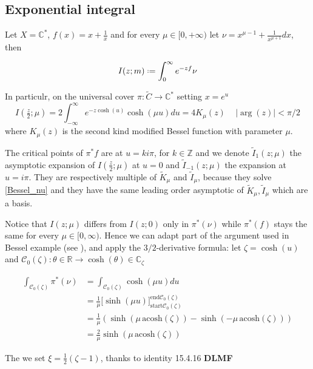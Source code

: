 \documentclass{article}
\newcommand{\Z}{\mathbb{Z}}
\newcommand{\R}{\mathbb{R}}
\newcommand{\C}{\mathbb{C}}
\begin{document}
\subsection{Exponential integral}

Let $X=\C^*$, $f(x)=x+\frac{1}{x}$ and for every $\mu\in [0,+\infty)$ let $\nu=x^{\mu-1}+\frac{1}{x^{\mu+1}}dx$, then  

\begin{equation}
I(z;m)\defeq\int_{0}^{\infty}e^{-zf}\nu
\end{equation}

In particulr, on the universal cover $\pi\colon\tilde{C}\to \C^*$ setting $x=e^u$ 
\begin{equation}
I(\tfrac{z}{2};\mu)=2\int_{-\infty}^{\infty}e^{-z\cosh(u)}\cosh(\mu u)du=4K_\mu(z)\,\quad |\arg(z)|<\pi/2
\end{equation} 
where $K_\mu(z)$ is the second kind modified Bessel function with parameter $\mu$. 

The critical points of $\pi^* f$ are at $u=k i \pi$, for $k\in\Z$ and we denote $\tilde{I}_{1}(z;\mu)$ the asymptotic expansion of $I(\tfrac{z}{2};\mu)$ at $u=0$ and $\tilde{I}_{-1}(z;\mu)$ the expansion at $u=i \pi$. They are respectively multiple of $\tilde{K}_{\mu}$ and $\tilde{I}_{\mu}$, because they solve \eqref{Bessel_nu} and they have the same leading order asymptotic of $\tilde{K}_{\mu}, \tilde{I}_{\mu}$ which are a basis.  

Notice that $I(z;\mu)$ differs from $I(z;0)$ only in $\pi^*(\nu)$ while $\pi^*(f)$ stays the same for every $\mu\in [0,\infty)$. Hence we can adapt part of the argument used in Bessel example (see ), and apply the $3/2$-derivative formula: let $\zeta=\cosh(u)$ and $\mathcal{C}_0(\zeta)\colon\theta\in\R\to\cosh(\theta)\in\C_\zeta$

\begin{align*}
\int_{\mathcal{C}_0(\zeta)}\pi^*(\nu)&=\int_{\mathcal{C}_0(\zeta)}\cosh(\mu u)du\\
&=\frac{1}{\mu}\Big[\sinh(\mu u)\Big]_{\mathrm{start}\mathcal{C}_0(\zeta)}^{\mathrm{end}\mathcal{C}_0(\zeta)}\\
&=\frac{1}{\mu}\left(\sinh\left(\mu\,\mathrm{acosh}\left(\zeta\right)\right)-\sinh\left(-\mu\,\mathrm{acosh}\left(\zeta\right)\right)\right)\\
&=\frac{2}{\mu}\sinh\left(\mu\,\mathrm{acosh}\left(\zeta\right)\right)
\end{align*}


The we set $\xi=\frac{1}{2}\left(\zeta-1\right)$, thanks to identity 15.4.16 \textbf{DLMF}
\end{document}
